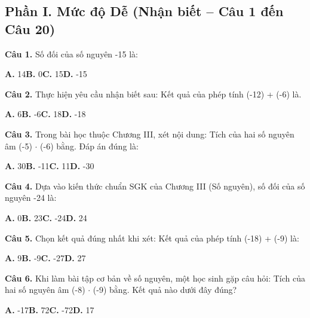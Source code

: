 \documentclass[11pt,a4paper]{article}
\begin{document}
\subsection*{\color{accent} Phần I. Mức độ Dễ (Nhận biết -- Câu 1 đến Câu 20)}
\textbf{\color{primary} Câu 1.} Số đối của số nguyên -15 là:\par
\hspace*{1.5em}\textbf{A.} 14\quad\quad \textbf{B.} 0\quad\quad \textbf{C.} 15\quad\quad \textbf{D.} -15\par\vspace{2pt}
\textbf{\color{primary} Câu 2.} Thực hiện yêu cầu nhận biết sau: Kết quả của phép tính (-12) + (-6) là.\par
\hspace*{1.5em}\textbf{A.} 6\quad\quad \textbf{B.} -6\quad\quad \textbf{C.} 18\quad\quad \textbf{D.} -18\par\vspace{2pt}
\textbf{\color{primary} Câu 3.} Trong bài học thuộc Chương III, xét nội dung: Tích của hai số nguyên âm (-5) $\cdot$ (-6) bằng. Đáp án đúng là:\par
\hspace*{1.5em}\textbf{A.} 30\quad\quad \textbf{B.} -11\quad\quad \textbf{C.} 11\quad\quad \textbf{D.} -30\par\vspace{2pt}
\textbf{\color{primary} Câu 4.} Dựa vào kiến thức chuẩn SGK của Chương III (Số nguyên), số đối của số nguyên -24 là:\par
\hspace*{1.5em}\textbf{A.} 0\quad\quad \textbf{B.} 23\quad\quad \textbf{C.} -24\quad\quad \textbf{D.} 24\par\vspace{2pt}
\textbf{\color{primary} Câu 5.} Chọn kết quả đúng nhất khi xét: Kết quả của phép tính (-18) + (-9) là:\par
\hspace*{1.5em}\textbf{A.} 9\quad\quad \textbf{B.} -9\quad\quad \textbf{C.} -27\quad\quad \textbf{D.} 27\par\vspace{2pt}
\textbf{\color{primary} Câu 6.} Khi làm bài tập cơ bản về số nguyên, một học sinh gặp câu hỏi: Tích của hai số nguyên âm (-8) $\cdot$ (-9) bằng. Kết quả nào dưới đây đúng?\par
\hspace*{1.5em}\textbf{A.} -17\quad\quad \textbf{B.} 72\quad\quad \textbf{C.} -72\quad\quad \textbf{D.} 17\par\vspace{2pt}
\end{document}
